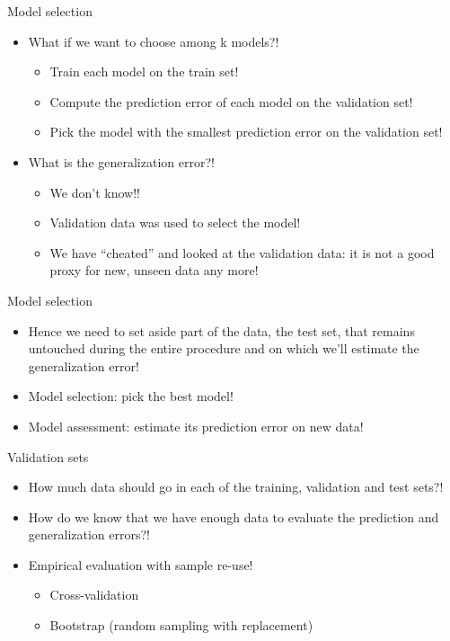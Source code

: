 \documentclass[xcolor={usenames,dvipsnames},handout]{beamer}
\begin{document}
\begin{frame}{Model selection}
\begin{itemize}
\item What if we want to choose among k models?!
\begin{itemize}
\item  Train each model on the train set!
\item   Compute the prediction error of each model on the validation set!
\item Pick the model with the smallest prediction error on the validation set!
\end{itemize}
\item What is the generalization error?!
\begin{itemize}
\item  We don’t know!!
\item  Validation data was used to select the model!
\item   We have “cheated” and looked at the validation data: it is not a good proxy for new, unseen data any more!
\end{itemize}
\end{itemize}
\end{frame}

\begin{frame}{Model selection}
\begin{itemize}
\item Hence we need to set aside part of the data, the test set, that remains untouched during the entire procedure and on which we’ll estimate the generalization error!
\end{itemize}
\begin{exampleblock}{}
\begin{itemize}
\item Model selection: pick the best model!
\item Model assessment: estimate its prediction error on new data!
\end{itemize}
\end{exampleblock}
\end{frame}

\begin{frame}{Validation sets}
\begin{itemize}
\item How much data should go in each of the training, validation and test sets?!
\item   How do we know that we have enough data to evaluate the prediction and generalization errors?!
\item  Empirical evaluation with sample re-use!
\begin{itemize}
\item  Cross-validation
\item  Bootstrap (random sampling with replacement)
\end{itemize}
\end{itemize}
\end{frame}
\end{document}
